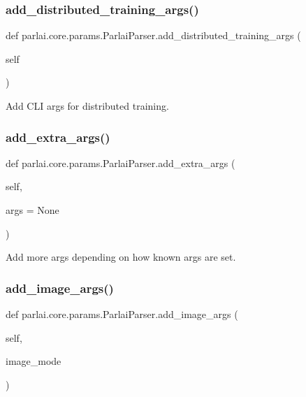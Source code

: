 \subsubsection{\texorpdfstring{add\+\_\+distributed\+\_\+training\+\_\+args()}{add\_distributed\_training\_args()}}
{\footnotesize\ttfamily def parlai.\+core.\+params.\+Parlai\+Parser.\+add\+\_\+distributed\+\_\+training\+\_\+args (\begin{DoxyParamCaption}\item[{}]{self }\end{DoxyParamCaption})}

\begin{DoxyVerb}Add CLI args for distributed training.
\end{DoxyVerb}
 \mbox{\label{classparlai_1_1core_1_1params_1_1ParlaiParser_ade9c068595c2b1110d019f3dedeb79ba}} 
\subsubsection{\texorpdfstring{add\+\_\+extra\+\_\+args()}{add\_extra\_args()}}
{\footnotesize\ttfamily def parlai.\+core.\+params.\+Parlai\+Parser.\+add\+\_\+extra\+\_\+args (\begin{DoxyParamCaption}\item[{}]{self,  }\item[{}]{args = {\ttfamily None} }\end{DoxyParamCaption})}

\begin{DoxyVerb}Add more args depending on how known args are set.
\end{DoxyVerb}
 \mbox{\label{classparlai_1_1core_1_1params_1_1ParlaiParser_a33d186a0cd665df88726b96f1bc3d88e}} 
\subsubsection{\texorpdfstring{add\+\_\+image\+\_\+args()}{add\_image\_args()}}
{\footnotesize\ttfamily def parlai.\+core.\+params.\+Parlai\+Parser.\+add\+\_\+image\+\_\+args (\begin{DoxyParamCaption}\item[{}]{self,  }\item[{}]{image\+\_\+mode }\end{DoxyParamCaption})}

